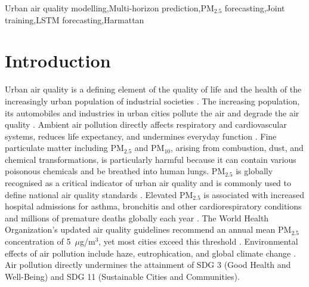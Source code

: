 \documentclass[a4paper,fleqn]{cas-sc}
\begin{document}
\begin{keywords}
Urban air quality modelling\sep Multi-horizon prediction\sep PM$_{2.5}$ forecasting\sep Joint training\sep LSTM forecasting\sep Harmattan
\end{keywords}


\maketitle

\section{Introduction} \label{sec1}

Urban air quality is a defining element of the quality of life and the health of the increasingly urban population of industrial societies \cite{volgyesi2008air}. The increasing population, its automobiles and industries in urban cities pollute the air and degrade the air quality \cite{kang2018air}. Ambient air pollution directly affects respiratory and cardiovascular systems, reduces life expectancy, and undermines everyday function \cite{jia2023effect,zhang2023air}. Fine particulate matter including PM$_{2.5}$ and PM$_{10}$, arising from combustion, dust, and chemical transformations, is particularly harmful because it can contain various poisonous chemicals and be breathed into human lungs. PM$_{2.5}$ is globally recognised as a critical indicator of urban air quality and is commonly used to define national air quality standards \cite{hodoli2024urban}. Elevated PM$_{2.5}$ is associated with increased hospital admissions for asthma, bronchitis and other cardiorespiratory conditions and millions of premature deaths globally each year \cite{lelieveld2019effects,world2021global}. The World Health Organization’s updated air quality guidelines recommend an annual mean PM$_{2.5}$ concentration of 5~$\mu$g/m$^3$, yet most cities exceed this threshold \cite{pai2022updated}. Environmental effects of air pollution include haze, eutrophication, and global climate change \cite{kang2018air}. Air pollution directly undermines the attainment of SDG 3 (Good Health and Well-Being) and SDG 11 (Sustainable Cities and Communities). 
\end{document}
